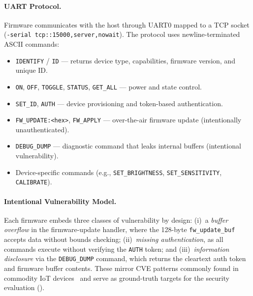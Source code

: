 \paragraph{UART Protocol.}
Firmware communicates with the host through UART0 mapped to a TCP
socket (\texttt{-serial tcp::15000,server,nowait}).  The protocol
uses newline-terminated ASCII commands:
\begin{itemize}[leftmargin=*]
  \item \texttt{IDENTIFY} / \texttt{ID} --- returns device type,
    capabilities, firmware version, and unique ID.
  \item \texttt{ON}, \texttt{OFF}, \texttt{TOGGLE},
    \texttt{STATUS}, \texttt{GET\_ALL} --- power and state control.
  \item \texttt{SET\_ID}, \texttt{AUTH} --- device provisioning and
    token-based authentication.
  \item \texttt{FW\_UPDATE:<hex>}, \texttt{FW\_APPLY} --- over-the-air
    firmware update (intentionally unauthenticated).
  \item \texttt{DEBUG\_DUMP} --- diagnostic command that leaks
    internal buffers (intentional vulnerability).
  \item Device-specific commands (e.g., \texttt{SET\_BRIGHTNESS},
    \texttt{SET\_SENSITIVITY}, \texttt{CALIBRATE}).
\end{itemize}

\paragraph{Intentional Vulnerability Model.}
Each firmware embeds three classes of vulnerability by design:
(i)~a \emph{buffer overflow} in the firmware-update handler, where
the 128-byte \texttt{fw\_update\_buf} accepts data without bounds
checking;
(ii)~\emph{missing authentication}, as all commands execute without
verifying the \texttt{AUTH} token; and
(iii)~\emph{information disclosure} via the \texttt{DEBUG\_DUMP}
command, which returns the cleartext auth token and firmware buffer
contents.
These mirror CVE patterns commonly found in commodity IoT
devices~\cite{owasp-iot-top10} and serve as ground-truth targets
for the security evaluation ().


